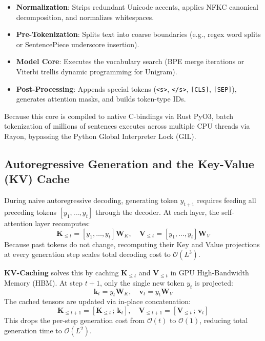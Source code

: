 \documentclass[11pt,a4paper]{article}
\begin{document}
\begin{itemize}
    \item \textbf{Normalization}: Strips redundant Unicode accents, applies NFKC canonical decomposition, and normalizes whitespaces.
    \item \textbf{Pre-Tokenization}: Splits text into coarse boundaries (e.g., regex word splits or SentencePiece underscore insertion).
    \item \textbf{Model Core}: Executes the vocabulary search (BPE merge iterations or Viterbi trellis dynamic programming for Unigram).
    \item \textbf{Post-Processing}: Appends special tokens (\texttt{<s>}, \texttt{</s>}, \texttt{[CLS]}, \texttt{[SEP]}), generates attention masks, and builds token-type IDs.
\end{itemize}

Because this core is compiled to native C-bindings via Rust PyO3, batch tokenization of millions of sentences executes across multiple CPU threads via Rayon, bypassing the Python Global Interpreter Lock (GIL).

\subsection{Autoregressive Generation and the Key-Value (KV) Cache}

During naive autoregressive decoding, generating token $y_{t+1}$ requires feeding all preceding tokens $[y_1, \dots, y_t]$ through the decoder. At each layer, the self-attention layer recomputes:
\begin{equation}
\mathbf{K}_{\le t} = [y_1, \dots, y_t]\mathbf{W}_K, \quad \mathbf{V}_{\le t} = [y_1, \dots, y_t]\mathbf{W}_V
\end{equation}
Because past tokens do not change, recomputing their Key and Value projections at every generation step scales total decoding cost to $\mathcal{O}(L^3)$.

\textbf{KV-Caching} solves this by caching $\mathbf{K}_{\le t}$ and $\mathbf{V}_{\le t}$ in GPU High-Bandwidth Memory (HBM). At step $t+1$, only the single new token $y_t$ is projected:
\begin{equation}
\mathbf{k}_{t} = y_t \mathbf{W}_K, \quad \mathbf{v}_{t} = y_t \mathbf{W}_V
\end{equation}
The cached tensors are updated via in-place concatenation:
\begin{equation}
\mathbf{K}_{\le t+1} = [\mathbf{K}_{\le t} \,;\, \mathbf{k}_t], \quad \mathbf{V}_{\le t+1} = [\mathbf{V}_{\le t} \,;\, \mathbf{v}_t]
\end{equation}
This drops the per-step generation cost from $\mathcal{O}(t)$ to $\mathcal{O}(1)$, reducing total generation time to $\mathcal{O}(L^2)$.
\end{document}
